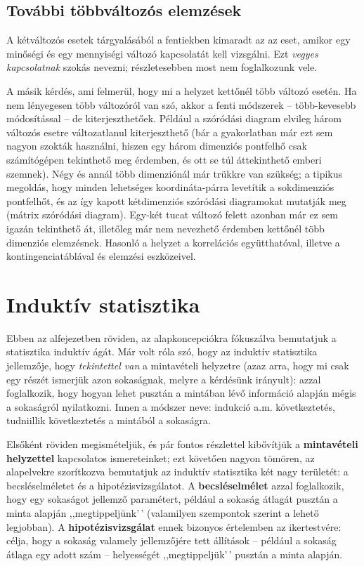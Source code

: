\documentclass[
]{book}
\begin{document}
\hypertarget{deskriptivtovabbitobbvalt}{%
\section{További többváltozós elemzések}\label{deskriptivtovabbitobbvalt}}

A kétváltozós esetek tárgyalásából a fentiekben kimaradt az az eset, amikor egy minőségi és egy mennyiségi változó kapcsolatát kell vizsgálni. Ezt \emph{vegyes kapcsolatnak} szokás nevezni; részletesebben most nem foglalkozunk vele.

A másik kérdés, ami felmerül, hogy mi a helyzet kettőnél több változó esetén. Ha nem lényegesen több változóról van szó, akkor a fenti módszerek -- több-kevesebb módosítással -- de kiterjeszthetőek. Például a szóródási diagram elvileg három változós esetre változatlanul kiterjeszthető (bár a gyakorlatban már ezt sem nagyon szokták használni, hiszen egy három dimenziós pontfelhő csak számítógépen tekinthető meg érdemben, és ott se túl áttekinthető emberi szemnek). Négy és annál több dimenziónál már trükkre van szükség; a tipikus megoldás, hogy minden lehetséges koordináta-párra levetítik a sokdimenziós pontfelhőt, és az így kapott kétdimenziós szóródási diagramokat mutatják meg (mátrix szóródási diagram). Egy-két tucat változó felett azonban már ez sem igazán tekinthető át, illetőleg már nem nevezhető érdemben kettőnél több dimenziós elemzésnek. Hasonló a helyzet a korrelációs együtthatóval, illetve a kontingenciatáblával és elemzési eszközeivel.

\hypertarget{induktiv}{%
\chapter{Induktív statisztika}\label{induktiv}}

Ebben az alfejezetben röviden, az alapkoncepciókra fókuszálva bemutatjuk a statisztika induktív ágát. Már volt róla szó, hogy az induktív statisztika jellemzője, hogy \emph{tekintettel van} a mintavételi helyzetre (azaz arra, hogy mi csak egy részét ismerjük azon sokaságnak, melyre a kérdésünk irányult): azzal foglalkozik, hogy hogyan lehet pusztán a mintában lévő információ alapján mégis a sokaságról nyilatkozni. Innen a módszer neve: indukció a.m. következtetés, tudniillik következtetés a mintából a sokaságra.

Elsőként röviden megismételjük, és pár fontos részlettel kibővítjük a \textbf{mintavételi helyzettel} kapcsolatos ismereteinket; ezt követően nagyon tömören, az alapelvekre szorítkozva bemutatjuk az induktív statisztika két nagy területét: a becsléselméletet és a hipotézisvizsgálatot. A \textbf{becsléselmélet} azzal foglalkozik, hogy egy sokaságot jellemző paramétert, például a sokaság átlagát pusztán a minta alapján ,,megtippeljünk'\,' (valamilyen szempontok szerint a lehető legjobban). A \textbf{hipotézisvizsgálat} ennek bizonyos értelemben az ikertestvére: célja, hogy a sokaság valamely jellemzőjére tett állítások -- például a sokaság átlaga egy adott szám -- helyességét ,,megtippeljük'\,' pusztán a minta alapján.
\end{document}

